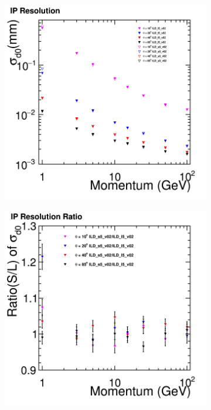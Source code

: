 \begin{figure}[htbp]
\begin{subfigure}{0.49\hsize}
 \caption{  \label{fig:perf:trk_ptcmp}}
 \end{subfigure}
\begin{subfigure}{0.49\hsize} 
 \includegraphics[width=\hsize]{Performance/fig/D0Resolution_compare_v02-00-02_New_ILD_ls5_v02.png}
 \caption{ \label{fig:perf:trk_d0}}
 \end{subfigure}
\begin{subfigure}{0.49\hsize} 
 \includegraphics[width=\hsize]{Performance/fig/D0Resolution_Ratio_v02-00-02_New_ILD_ls5_v02.png}

\end{subfigure}
\end{figure}
